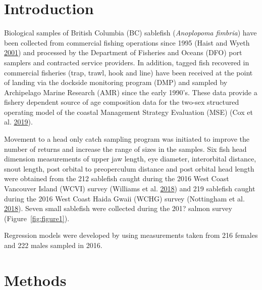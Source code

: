 \documentclass[12pt]{article}\usepackage[]{graphicx}\usepackage[]{color}
\begin{document}

\frontmatter


\renewcommand{\headrulewidth}{0.5pt}  %
\renewcommand{\footrulewidth}{0.5pt}  %

\hypertarget{introduction}{%
\section{Introduction}\label{introduction}}

Biological samples of British Columbia (BC) sablefish (\emph{Anoplopoma fimbria}) have been collected from commercial fishing operations since 1995 (Haist and Wyeth \protect\hyperlink{ref-Haist2001}{2001}) and processed by the Department of Fisheries and Oceans (DFO) port samplers and contracted service providers. In addition, tagged fish recovered in commercial fisheries (trap, trawl, hook and line) have been received at the point of landing via the dockside monitoring program (DMP) and sampled by Archipelago Marine Research (AMR) since the early 1990's. These data provide a fishery dependent source of age composition data for the two-sex structured operating model of the coastal Management Strategy Evaluation (MSE) (Cox et al. \protect\hyperlink{ref-Cox2019}{2019}).

Movement to a head only catch sampling program was initiated to improve the number of returns and increase the range of sizes in the samples. Six fish head dimension measurements of upper jaw length, eye diameter, interorbital distance, snout length, post orbital to preoperculum distance and post orbital head length were obtained from the 212 sablefish caught during the 2016 West Coast Vancouver Island (WCVI) survey (Williams et al. \protect\hyperlink{ref-Williams2018}{2018}) and 219 sablefish caught during the 2016 West Coast Haida Gwaii (WCHG) survey (Nottingham et al. \protect\hyperlink{ref-Nottingham2018}{2018}). Seven small sablefish were collected during the 201? salmon survey (Figure~\ref{fig:figure1}).

Regression models were developed by using measurements taken from 216 females and 222 males sampled in 2016.

\hypertarget{methods}{%
\section{Methods}\label{methods}}
\end{document}
